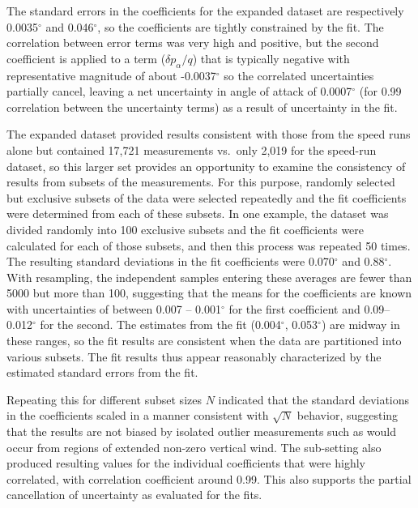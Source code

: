 \documentclass[12pt,twoside,english]{article}\usepackage[]{graphicx}\usepackage[]{color}
\let\OrgIndex\index
\renewcommand*{\index}[1]{\OrgIndex{#1}}
\begin{document}
{{The standard errors in the coefficients for the expanded dataset are respectively 0.0035$^{\circ}$ and 0.046$^{\circ}$, so the coefficients are tightly constrained by the fit.  The correlation between error terms was very high and positive, but the second coefficient is applied to a term ($\delta p_{\alpha}/q$) that is typically negative with representative magnitude of about -0.0037$^{\circ}$ so the correlated uncertainties partially cancel, leaving a net uncertainty in angle of attack of 0.0007$^{\circ}$ (for 0.99 correlation between the uncertainty terms) as a result of uncertainty in the fit. 

The expanded dataset provided results consistent with those from the speed runs alone but contained 17,721 measurements vs.~only 2,019 for the speed-run dataset, so this larger set provides an opportunity to examine the consistency of results from subsets of the measurements. For this purpose, randomly selected but exclusive subsets of the data were selected repeatedly and the fit coefficients were determined from each of these subsets. In one example, the dataset was divided randomly into 100 exclusive subsets and the fit coefficients were calculated for each of those subsets, and then this process was repeated 50 times. The resulting standard deviations in the fit coefficients were 0.070$^{\circ}$ and 0.88$^{\circ}$. With resampling, the independent samples entering these averages are fewer than 5000 but more than 100, suggesting that the means for the coefficients are known with uncertainties of between 0.007 -- 0.001$^{\circ}$ for the first coefficient and 0.09--0.012$^{\circ}$ for the second. The estimates from the fit (0.004$^{\circ}$, 0.053$^{\circ}$) are midway in these ranges, so the fit results are consistent when the data are partitioned into various subsets. The fit results thus appear reasonably characterized by the estimated standard errors from the fit. 

Repeating this for different subset sizes $N$ indicated that the standard deviations in the coefficients scaled in a manner consistent with $\sqrt{N}$ behavior, suggesting that the results are not biased by isolated outlier measurements such as would occur from regions of extended non-zero vertical wind. The sub-setting also produced resulting values for the individual coefficients that were highly correlated, with correlation coefficient around 0.99. This also supports the partial cancellation of uncertainty as evaluated for the fits. 

}}
\end{document}
